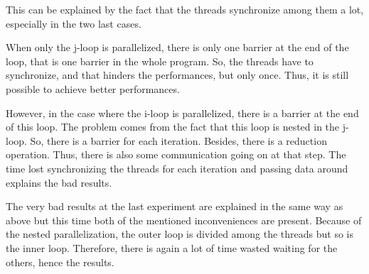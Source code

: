 This can be explained by the fact that the threads synchronize among them a lot, especially in the two last cases.

When only the j-loop is parallelized, there is only one barrier at the end of the loop, that is one barrier in the whole program. So, the threads have to synchronize, and that hinders the performances, but only once. Thus, it is still possible to achieve better performances.

However, in the case where the i-loop is parallelized, there is a barrier at the end of this loop. The problem comes from the fact that this loop is nested in the j-loop. So, there is a barrier for each iteration. Besides, there is a reduction operation. Thus, there is also some communication going on at that step. The time lost synchronizing the threads for each iteration and passing data around explains the bad results.

The very bad results at the last experiment are explained in the same way as above but this time both of the mentioned inconveniences are present. Because of the nested parallelization, the outer loop is divided among the threads but so is the inner loop. Therefore, there is again a lot of time wasted waiting for the others, hence the results.     
